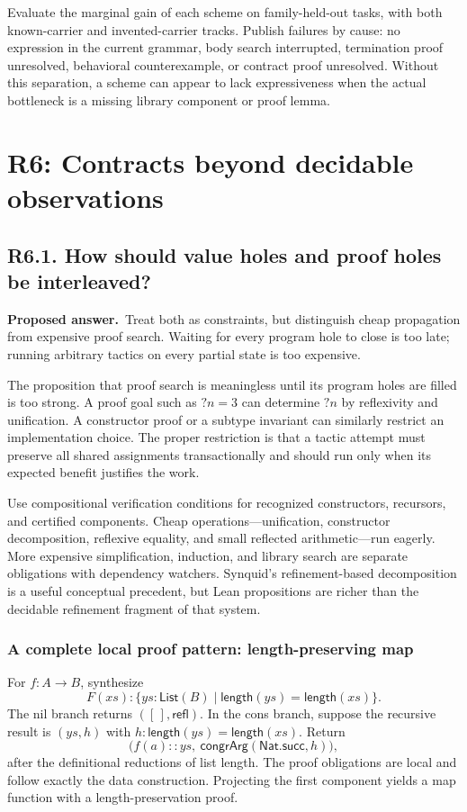 \documentclass[11pt,a4paper]{article}
\newcommand{\List}{\mathsf{List}}
\newcommand{\len}{\mathsf{length}}
\newcommand{\nil}{[\,]}
\newcommand{\cons}{\mathbin{::}}
\newcommand{\question}[2]{\subsection{#1. #2}\label{q:#1}}
\newcommand{\answer}{\textbf{Proposed answer.}\ }
\theoremstyle{remark}
\begin{document}
Evaluate the marginal gain of each scheme on family-held-out tasks, with
both known-carrier and invented-carrier tracks. Publish failures by cause:
no expression in the current grammar, body search interrupted, termination
proof unresolved, behavioral counterexample, or contract proof unresolved.
Without this separation, a scheme can appear to lack expressiveness when
the actual bottleneck is a missing library component or proof lemma.

\section{R6: Contracts beyond decidable observations}
\label{sec:r6}

\question{R6.1}{How should value holes and proof holes be interleaved?}

\answer Treat both as constraints, but distinguish cheap propagation from
expensive proof search. Waiting for every program hole to close is too late;
running arbitrary tactics on every partial state is too expensive.

The proposition that proof search is meaningless until its program holes
are filled is too strong. A proof goal such as $\mathord?n=3$ can determine
$\mathord?n$ by reflexivity and unification. A constructor proof or a
subtype invariant can similarly restrict an implementation choice. The
proper restriction is that a tactic attempt must preserve all shared
assignments transactionally and should run only when its expected benefit
justifies the work.

Use compositional verification conditions for recognized constructors,
recursors, and certified components. Cheap operations---unification,
constructor decomposition, reflexive equality, and small reflected
arithmetic---run eagerly. More expensive simplification, induction, and
library search are separate obligations with dependency watchers. Synquid's
refinement-based decomposition is a useful conceptual precedent, but Lean
propositions are richer than the decidable refinement fragment of that
system.\cite{synquid}

\subsubsection*{A complete local proof pattern: length-preserving map}

For $f:A\to B$, synthesize
\[
 F(xs):\{ys:\List(B)\mid \len(ys)=\len(xs)\}.
\]
The nil branch returns $(\nil,\mathsf{refl})$. In the cons branch, suppose
the recursive result is $(ys,h)$ with $h:\len(ys)=\len(xs)$. Return
\[
 \bigl(f(a)\cons ys,\ \mathsf{congrArg}(\mathsf{Nat.succ},h)\bigr),
\]
after the definitional reductions of list length. The proof obligations are
local and follow exactly the data construction. Projecting the first
component yields a map function with a length-preservation proof.
\end{document}
